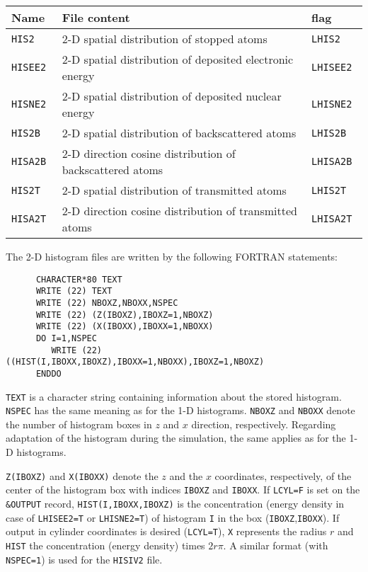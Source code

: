 \bigskip
%
\begin{center}
\begin{tabular}{|l|p{}|l|}
\hline
Name       & File content                                               & flag \\
\hline
\tt HIS2   & 2-D spatial distribution of stopped atoms                  & \tt LHIS2 \\
\tt HISEE2 & 2-D spatial distribution of deposited electronic energy    & \tt LHISEE2 \\
\tt HISNE2 & 2-D spatial distribution of deposited nuclear energy       & \tt LHISNE2 \\
\tt HIS2B  & 2-D spatial distribution of backscattered atoms            & \tt LHIS2B \\
\tt HISA2B & 2-D direction cosine distribution of backscattered atoms   & \tt LHISA2B \\
\tt HIS2T  & 2-D spatial distribution of transmitted atoms              & \tt LHIS2T \\
\tt HISA2T & 2-D direction cosine distribution of transmitted atoms     & \tt LHISA2T \\
\hline
\end{tabular}
\end{center}

\bigskip

The 2-D histogram files are written by the following FORTRAN statements:
%
\begin{verbatim}
      CHARACTER*80 TEXT
      WRITE (22) TEXT
      WRITE (22) NBOXZ,NBOXX,NSPEC
      WRITE (22) (Z(IBOXZ),IBOXZ=1,NBOXZ)
      WRITE (22) (X(IBOXX),IBOXX=1,NBOXX)
      DO I=1,NSPEC
         WRITE (22) ((HIST(I,IBOXX,IBOXZ),IBOXX=1,NBOXX),IBOXZ=1,NBOXZ)
      ENDDO
\end{verbatim}
%
\texttt{TEXT} is a character string containing information about the stored
histogram. \texttt{NSPEC} has the same meaning as for the 1-D histograms.
\texttt{NBOXZ} and \texttt{NBOXX} denote the number of histogram boxes in $z$
and $x$ direction, respectively. Regarding adaptation of the histogram during
the simulation, the same applies as for the 1-D histograms.

\texttt{Z(IBOXZ)} and \texttt{X(IBOXX)} denote the $z$ and the $x$ coordinates,
respectively, of the center of the histogram box with indices \texttt{IBOXZ} and
\texttt{IBOXX}.  If \texttt{LCYL=F} is set on the \texttt{\&OUTPUT} record,
\texttt{HIST(I,IBOXX,IBOXZ)} is the concentration (energy density in case of
\texttt{LHISEE2=T} or \texttt{LHISNE2=T}) of histogram \texttt{I} in the box
(\texttt{IBOXZ},\texttt{IBOXX}). If output in cylinder coordinates is desired
(\texttt{LCYL=T}), \texttt{X} represents the radius $r$ and \texttt{HIST} the
concentration (energy density) times $2r\pi$.
\ifprivate A similar format (with \texttt{NSPEC=1}) is used for the
\texttt{HISIV2} file. \fi 

